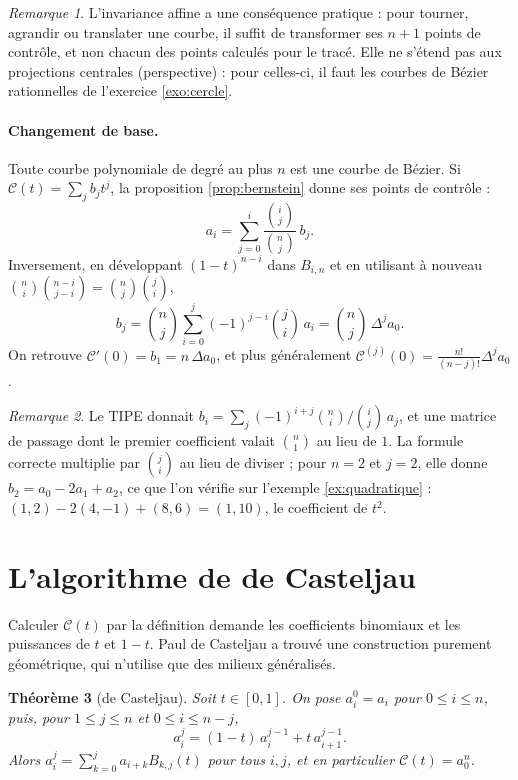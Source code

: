 \documentclass[11pt,a4paper]{article}
\theoremstyle{plain}
\newtheorem{theoreme}{Théorème}[section]
\theoremstyle{definition}
\theoremstyle{remark}
\newtheorem{remarque}[theoreme]{Remarque}
\newcommand{\C}{\mathcal{C}}
\begin{document}
\begin{remarque}
L'invariance affine a une conséquence pratique : pour tourner, agrandir ou translater une courbe, il suffit de transformer ses $n+1$ points de contrôle, et non chacun des points calculés pour le tracé. Elle ne s'étend pas aux projections centrales (perspective) : pour celles-ci, il faut les courbes de Bézier rationnelles de l'exercice \ref{exo:cercle}.
\end{remarque}

\paragraph{Changement de base.} Toute courbe polynomiale de degré au plus $n$ est une courbe de Bézier. Si $\C(t)=\sum_jb_jt^j$, la proposition \ref{prop:bernstein} donne ses points de contrôle :
\[
  a_i=\sum_{j=0}^i\frac{\binom ij}{\binom nj}\,b_j .
\]
Inversement, en développant $(1-t)^{n-i}$ dans $B_{i,n}$ et en utilisant à nouveau $\binom ni\binom{n-i}{j-i}=\binom nj\binom ji$,
\[
  b_j=\binom nj\sum_{i=0}^j(-1)^{j-i}\binom ji\,a_i=\binom nj\,\Delta^ja_0 .
\]
On retrouve $\C'(0)=b_1=n\,\Delta a_0$, et plus généralement $\C^{(j)}(0)=\frac{n!}{(n-j)!}\Delta^ja_0$.

\begin{remarque}
Le TIPE donnait $b_i=\sum_j(-1)^{i+j}\binom ni/\binom ij\,a_j$, et une matrice de passage dont le premier coefficient valait $\binom n1$ au lieu de $1$. La formule correcte multiplie par $\binom ji$ au lieu de diviser ; pour $n=2$ et $j=2$, elle donne $b_2=a_0-2a_1+a_2$, ce que l'on vérifie sur l'exemple \ref{ex:quadratique} : $(1,2)-2(4,-1)+(8,6)=(1,10)$, le coefficient de $t^2$.
\end{remarque}

\section{L'algorithme de de Casteljau}

Calculer $\C(t)$ par la définition demande les coefficients binomiaux et les puissances de $t$ et $1-t$. Paul de Casteljau a trouvé une construction purement géométrique, qui n'utilise que des milieux généralisés.

\begin{theoreme}[de Casteljau]\label{thm:casteljau}
Soit $t\in[0,1]$. On pose $a_i^0=a_i$ pour $0\leq i\leq n$, puis, pour $1\leq j\leq n$ et $0\leq i\leq n-j$,
\[
  a_i^j=(1-t)\,a_i^{j-1}+t\,a_{i+1}^{j-1} .
\]
Alors $a_i^j=\sum_{k=0}^ja_{i+k}B_{k,j}(t)$ pour tous $i,j$, et en particulier $\C(t)=a_0^n$.
\end{theoreme}
\end{document}
